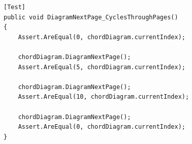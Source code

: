 \begin{lstlisting}[style=sharpcstyle,caption=Funkcja \texttt{DiagramNextPage\_CyclesThroughPages}, label=lst:80]
[Test]
public void DiagramNextPage_CyclesThroughPages()
{
    Assert.AreEqual(0, chordDiagram.currentIndex);

    chordDiagram.DiagramNextPage();
    Assert.AreEqual(5, chordDiagram.currentIndex);

    chordDiagram.DiagramNextPage();
    Assert.AreEqual(10, chordDiagram.currentIndex);

    chordDiagram.DiagramNextPage();
    Assert.AreEqual(0, chordDiagram.currentIndex);
}
\end{lstlisting}